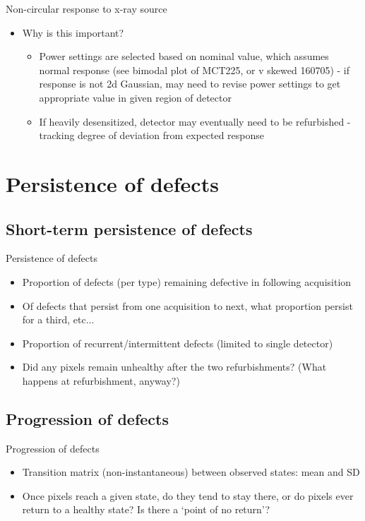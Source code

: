 \documentclass{beamer}
\begin{document}
\begin{frame}{Non-circular response to x-ray source}
  \begin{itemize}
  	\item Why is this important?
	\begin{itemize}
		\item Power settings are selected based on nominal value, which assumes normal response (see bimodal plot of MCT225, or v skewed 160705) - if response is not 2d Gaussian, may need to revise power settings to get appropriate value in given region of detector
		\item If heavily desensitized, detector may eventually need to be refurbished - tracking degree of deviation from expected response 
	\end{itemize}		 
  \end{itemize}
\end{frame}




\section{Persistence of defects}

\subsection{Short-term persistence of defects}
\begin{frame}{Persistence of defects}

	\begin{itemize}
		\item Proportion of defects (per type) remaining defective in following acquisition
		\item Of defects that persist from one acquisition to next, what proportion persist for a third, etc...
		\item Proportion of recurrent/intermittent defects (limited to single detector)
		\item Did any pixels remain unhealthy after the two refurbishments? (What happens at refurbishment, anyway?)
	\end{itemize}
\end{frame}

\subsection{Progression of defects}
\begin{frame}{Progression of defects}
	\begin{itemize}
		\item Transition matrix (non-instantaneous) between observed states: mean and SD
		\item Once pixels reach a given state, do they tend to stay there, or do pixels ever return to a healthy state? Is there a `point of no return'?
	\end{itemize}

\end{frame}
\end{document}
